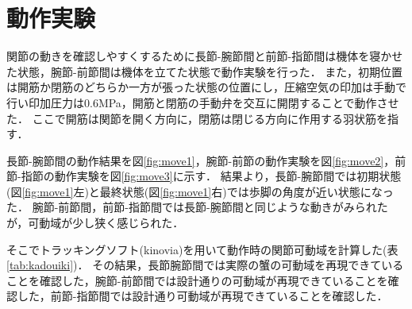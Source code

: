 \documentclass{jarticle}
\begin{document}
\section{動作実験}
関節の動きを確認しやすくするために長節-腕節間と前節-指節間は機体を寝かせた状態，腕節-前節間は機体を立てた状態で動作実験を行った．
また，初期位置は開筋か閉筋のどちらか一方が張った状態の位置にし，圧縮空気の印加は手動で行い印加圧力は0.6MPa，開筋と閉筋の手動弁を交互に開閉することで動作させた．
ここで開筋は関節を開く方向に，閉筋は閉じる方向に作用する羽状筋を指す．

長節-腕節間の動作結果を図\ref{fig:move1}，腕節-前節の動作実験を図\ref{fig:move2}，前節-指節の動作実験を図\ref{fig:move3}に示す．
結果より，長節-腕節間では初期状態(図\ref{fig:move1}左)と最終状態(図\ref{fig:move1}右)では歩脚の角度が近い状態になった．
腕節-前節間，前節-指節間では長節-腕節間と同じような動きがみられたが，可動域が少し狭く感じられた．

そこでトラッキングソフト(kinovia)を用いて動作時の関節可動域を計算した(表\ref{tab:kadouiki})．
その結果，長節腕節間では実際の蟹の可動域を再現できていることを確認した，腕節-前節間では設計通りの可動域が再現できていることを確認した，前節-指節間では設計通り可動域が再現できていることを確認した．
\end{document}
